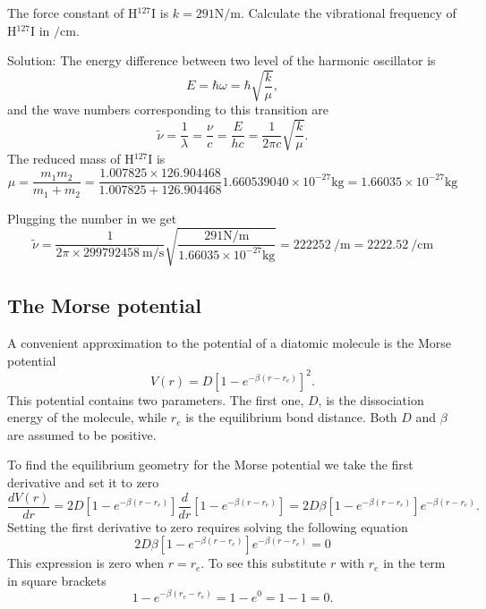 \documentclass[../Main/chem331-notes.tex]{subfiles}
\begin{document}
\begin{example}
The force constant of H${}^{127}$I is $k = 291 \si{\newton\per\meter}$. Calculate the vibrational frequency of H${}^{127}$I in $\si{\per\centi\meter}$.

Solution: The energy difference between two level of the harmonic oscillator is
\begin{equation}
E = \hbar \omega = \hbar \sqrt{\frac{k}{\mu}},
\end{equation}
and the wave numbers corresponding to this transition are
\begin{equation}
\tilde{\nu} = \frac{1}{\lambda} = \frac{\nu}{c} =  \frac{E}{hc} = \frac{1}{2\pi c}\sqrt{\frac{k}{\mu}}.
\end{equation}
The reduced mass of H${}^{127}$I is
\begin{equation}
\mu = \frac{m_1  m_2}{m_1 + m_2} = \frac{1.007825 \times 126.904468}{1.007825 + 126.904468} 1.660539040 \times 10^{-27} \si{\kilogram} = 1.66035 \times 10^{-27} \si{\kilogram}
\end{equation}

Plugging the number in we get
\begin{equation}
\tilde{\nu} = \frac{1}{2 \pi \times \SI{299792458}{\meter\per\second}}\sqrt{\frac{291 \si{\newton\per\meter}}{1.66035 \times 10^{-27} \si{\kilogram}}} = \SI{222252}{\per\meter} = \SI{2222.52}{\per\centi\meter}
\end{equation}
\end{example}



\subsection{The Morse potential}
A convenient approximation to the potential of a diatomic molecule is the Morse potential
\begin{equation}
V(r) = D \left[1 - e^{-\beta (r - r_e)} \right]^2.
\end{equation}
This potential contains two parameters. The first one, $D$, is the dissociation energy of the molecule, while $r_e$ is the equilibrium bond distance. Both  $D$ and $\beta$ are assumed to be positive.

To find the equilibrium geometry for the Morse potential we take the first derivative and set it to zero
\begin{equation}
\frac{d V(r)}{dr} = 2 D \left[1 - e^{-\beta (r - r_e)} \right] \frac{d}{dr} \left[1 - e^{-\beta (r - r_e)} \right]
= 2 D \beta \left[1 - e^{-\beta (r - r_e)} \right] e^{-\beta (r - r_e)}.
\end{equation}
Setting the first derivative to zero requires solving the following equation
\begin{equation}
2 D \beta \left[1 - e^{-\beta (r - r_e)} \right] e^{-\beta (r - r_e)} = 0
\end{equation}
This expression is zero when $r = r_e$. To see this substitute $r$ with $r_e$ in the term in square brackets
\begin{equation}
1 - e^{-\beta (r_e - r_e)}  = 1 - e^{0} = 1 - 1 = 0.
\end{equation}
\end{document}
